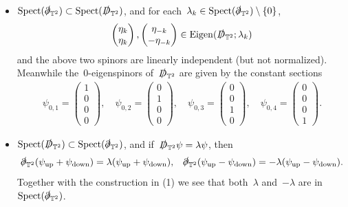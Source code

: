 \documentclass[10pt,a4paper]{amsart}
\newcommand{\T}{\mathbb{T}}
\newcommand{\D}{\slashed{D}}
\newcommand{\pd}{\slashed{\partial}}
\newcommand{\braces}[1]{\left\{#1\right\}} %
\DeclareMathOperator{\Eigen}{Eigen}
\DeclareMathOperator{\Spect}{Spect}
\DeclareMathOperator{\up}{up}
\DeclareMathOperator{\down}{down}
\begin{document}
\begin{itemize}
    \item[(1)] $\Spect(\pd_{\T^2})\subset\Spect(\D_{\T^2})$, and for each~$\lambda_k\in\Spect(\pd_{\T^2})\setminus \braces{0}$,
    \begin{align}
        \begin{pmatrix} \eta_k \\ \eta_k \end{pmatrix}, 
        \begin{pmatrix} \eta_{-k} \\ -\eta_{-k} \end{pmatrix}
        \in \Eigen(\D_{\T^2};\lambda_k)
    \end{align}
    and the above two spinors are linearly independent (but not normalized).
    Meanwhile the~$0$-eigenspinors of~$\D_{\T^2}$ are given by the constant sections 
    \begin{align}
        \psi_{0,1}=\begin{pmatrix} 1 \\ 0 \\ 0 \\ 0 \end{pmatrix}, \quad 
        \psi_{0,2}=\begin{pmatrix} 0 \\ 1 \\ 0 \\ 0 \end{pmatrix}, \quad 
        \psi_{0,3}=\begin{pmatrix} 0 \\ 0 \\ 1 \\ 0 \end{pmatrix}, \quad 
        \psi_{0,4}=\begin{pmatrix} 0 \\ 0 \\ 0 \\ 1 \end{pmatrix}. 
    \end{align}

    \item[(2)] $\Spect(\D_{\T^2})\subset\Spect(\pd_{\T^2})$, and if~$\D_{\T^2}\psi=\lambda\psi$, then
    \begin{align}
        \pd_{\T^2}(\psi_{\up}+\psi_{\down}) = \lambda (\psi_{\up}+\psi_{\down}), & & 
        \pd_{\T^2}(\psi_{\up}-\psi_{\down}) =-\lambda (\psi_{\up}-\psi_{\down}).
    \end{align}
    Together with the construction in (1) we see that both~$\lambda$ and~$-\lambda$ are in~$\Spect(\pd_{\T^2})$. 
\end{itemize}
\end{document}
